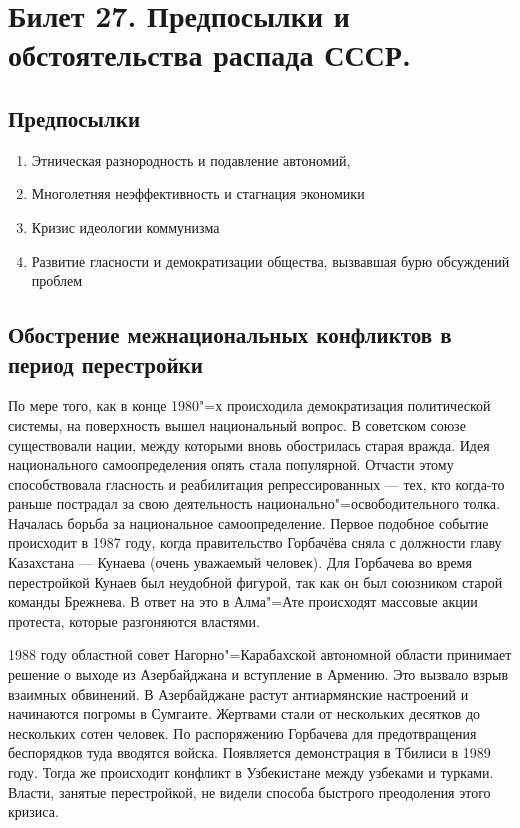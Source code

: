 \section{Билет 27. Предпосылки и обстоятельства распада СССР.}

\subsection{Предпосылки}
\begin{enumerate}
    \item Этническая разнородность и подавление автономий, 
    \item Многолетняя неэффективность и стагнация экономики
    \item Кризис идеологии коммунизма
    \item Развитие гласности и демократизации общества, вызвавшая бурю обсуждений проблем
\end{enumerate}

\subsection{Обострение межнациональных конфликтов в период перестройки}
По мере того, как в конце 1980"=х происходила демократизация политической системы, на поверхность вышел национальный вопрос. В советском союзе существовали нации, между которыми вновь обострилась старая вражда. Идея национального самоопределения опять стала популярной. Отчасти этому способствовала гласность и реабилитация репрессированных --- тех, кто когда-то раньше пострадал за свою деятельность национально"=освободительного толка. Началась борьба за национальное самоопределение. Первое подобное событие происходит в 1987 году, когда правительство Горбачёва сняла с должности главу Казахстана --- Кунаева (очень уважаемый человек). Для Горбачева во время перестройкой Кунаев был неудобной фигурой, так как он был союзником старой команды Брежнева. В ответ на это в Алма"=Ате происходят массовые акции протеста, которые разгоняются властями. 

1988 году областной совет Нагорно"=Карабахской автономной области принимает решение о выходе из Азербайджана и вступление в Армению. Это вызвало взрыв взаимных обвинений. В Азербайджане растут антиармянские настроений и начинаются погромы в Сумгаите. Жертвами стали от нескольких десятков до нескольких сотен человек. По распоряжению Горбачева для предотвращения беспорядков туда вводятся войска. Появляется демонстрация в Тбилиси в 1989 году. Тогда же происходит конфликт в Узбекистане между узбеками и турками. Власти, занятые перестройкой, не видели способа быстрого преодоления этого кризиса. 


